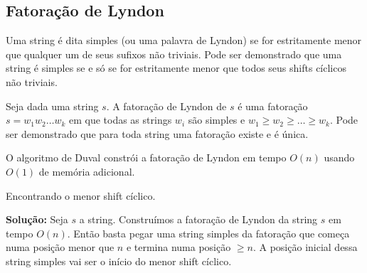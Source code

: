 \subsection{Fatoração de Lyndon}

Uma string é dita simples (ou uma palavra de Lyndon) se for estritamente menor que qualquer um de seus sufixos não triviais. Pode ser demonstrado que uma string é simples se e só se for estritamente menor que todos seus shifts cíclicos não triviais.

Seja dada uma string $s$. A fatoração de Lyndon de $s$ é uma fatoração $s= w_1 w_2 \dots w_k$ em que todas as strings $w_i$ são simples e $w_1 \geq w_2 \geq \dots \geq w_k$. Pode ser demonstrado que para toda string uma fatoração existe e é única.

O algoritmo de Duval constrói a fatoração de Lyndon em tempo $O(n)$ usando $O(1)$ de memória adicional.


 Encontrando o menor shift cíclico.

\textbf{Solução:} Seja $s$ a string. Construímos a fatoração de Lyndon da string $s$ em tempo $O(n)$. Então basta pegar uma string simples da fatoração que começa numa posição menor que $n$ e termina numa posição $\geq n$. A posição inicial dessa string simples vai ser o início do menor shift cíclico.

